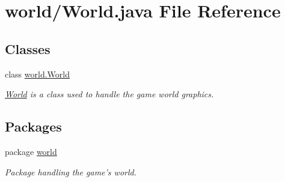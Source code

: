 \hypertarget{a00079}{\section{world/\-World.java File Reference}
\label{a00079}
}
\subsection*{Classes}
\begin{DoxyCompactItemize}
\item 
class \hyperlink{a00039}{world.\-World}
\begin{DoxyCompactList}\small\item\em \hyperlink{a00039}{World} is a class used to handle the game world graphics. \end{DoxyCompactList}\end{DoxyCompactItemize}
\subsection*{Packages}
\begin{DoxyCompactItemize}
\item 
package \hyperlink{a00089}{world}
\begin{DoxyCompactList}\small\item\em Package handling the game's world. \end{DoxyCompactList}\end{DoxyCompactItemize}
